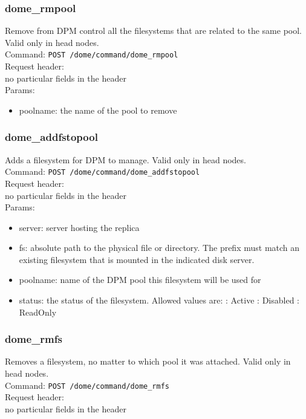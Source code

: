 \documentclass[a4paper,10pt]{scrreprt}
\begin{document}
\subsubsection{dome\_rmpool}
Remove from DPM control all the filesystems that are related to the same pool. Valid only in head nodes.\\
Command:
\lstinline"POST /dome/command/dome_rmpool"\\

Request header:\\
 no particular fields in the header\\

Params:
\begin{itemize}
 \item poolname: the name of the pool to remove
\end{itemize}


\subsubsection{dome\_addfstopool}
Adds a filesystem for DPM to manage. Valid only in head nodes.\\
Command:
\lstinline"POST /dome/command/dome_addfstopool"\\

Request header:\\
 no particular fields in the header\\

Params:
\begin{itemize}
 \item server: server hosting the replica
 \item fs: absolute path to the physical file or directory. The prefix must match an existing filesystem that is mounted in the indicated disk server.
 \item poolname: name of the DPM pool this filesystem will be used for
 \item status: the status of the filesystem. Allowed values are:
  : Active
  : Disabled
  : ReadOnly
\end{itemize}


\subsubsection{dome\_rmfs}

Removes a filesystem, no matter to which pool it was attached. Valid only in head nodes.\\
Command:
\lstinline"POST /dome/command/dome_rmfs"\\
Request header:\\
 no particular fields in the header\\
\end{document}
